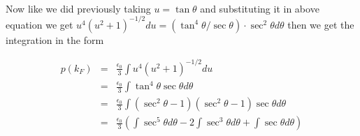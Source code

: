 \documentclass{report}
\begin{document}
\paragraph{ }
Now like we did previously taking $u= \tan\theta$ and substituting it in above equation we get $u^4(u^2+1)^{-1/2}du = \left(\tan^4\theta/\sec \theta\right)\cdot\sec^2\theta d\theta$ then we get the integration in the form
\begin{center}
\begin{eqnarray}
p(k_F) &=& \frac{\epsilon_0}{3} \int u^4(u^2+1)^{-1/2}du  \nonumber \\
	&=& \frac{\epsilon_0}{3}\int \tan^4\theta\sec\theta d\theta \nonumber \\
	&=& \frac{\epsilon_0}{3}\int \left(  \sec^2 \theta -1 \right)\left(  \sec^2 \theta -1 \right) \sec \theta d \theta \nonumber \\
	&=&\frac{\epsilon_0}{3}\left(\int \sec^5\theta d\theta - 2\int \sec^3 \theta d \theta + \int \sec \theta d\theta \right) \nonumber
\end{eqnarray}
\end{center}
\newpage
\end{document}
